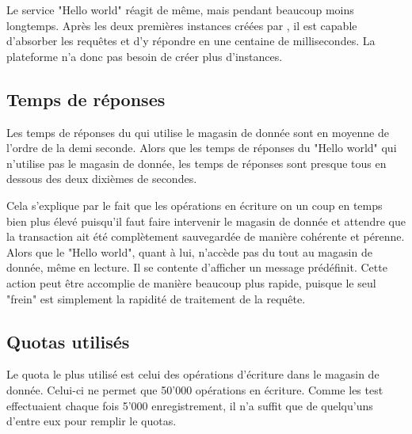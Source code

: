\documentclass[french]{msereport}
\newcommand{\gae}{\brand{Google App Engine}}
\begin{document}
			
			Le service "Hello world" réagit de même, mais pendant beaucoup moins longtemps. Après les deux premières instances créées par \gae, il est capable d'absorber les requêtes et d'y répondre en une centaine de millisecondes. La plateforme n'a donc pas besoin de créer plus d'instances.

				
		\subsection{Temps de réponses}
			Les temps de réponses du  qui utilise le magasin de donnée sont en moyenne de l'ordre de la demi seconde. Alors que les temps de réponses du  "Hello world" qui n'utilise pas le magasin de donnée, les temps de réponses sont presque tous en dessous des deux dixièmes de secondes.
			
			Cela s'explique par le fait que les opérations en écriture on un coup en temps bien plus élevé puisqu'il faut faire intervenir le magasin de donnée et attendre que la transaction ait été complètement sauvegardée de manière cohérente et pérenne. Alors que le "Hello world", quant à lui, n'accède pas du tout au magasin de donnée, même en lecture. Il se contente d'afficher un message prédéfinit. Cette action peut être accomplie de manière beaucoup plus rapide, puisque le seul "frein" est simplement la rapidité de traitement de la requête.
		
		\clearpage
		\subsection{Quotas utilisés}
			
			Le quota le plus utilisé est celui des opérations d'écriture dans le magasin de donnée. Celui-ci ne permet que 50'000 opérations en écriture. Comme les test effectuaient chaque fois 5'000 enregistrement, il n'a suffit que de quelqu'uns d'entre eux pour remplir le quotas.
			
\end{document}
